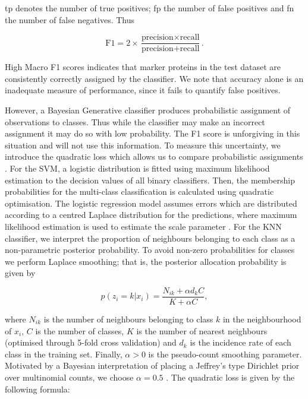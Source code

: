\documentclass[12pt,english]{article}\usepackage[]{graphicx}\usepackage[]{color}
\begin{document}
tp denotes the number of true positives; fp the number of
false positives and fn the number of false negatives. Thus

\[\text{F1}=2\times\frac{\text{precision}\times\text{recall}}{\text{precision}+\text{recall}}.\]

High Macro F1 scores indicates that marker proteins in the test
dataset are consistently correctly assigned by the classifier. We note
that accuracy alone is an inadequate measure of performance, since it
fails to quantify false positives.

However, a Bayesian Generative classifier produces probabilistic
assignment of observations to classes. Thus while the classifier may
make an incorrect assignment it may do so with low probability. The F1
score is unforgiving in this situation and will not use this
information.  To measure this uncertainty, we introduce the quadratic
loss which allows us to compare probabilistic assignments
\citep{Gneiting:2007}.  For the SVM, a logistic distribution is fitted
using maximum likelihood estimation to the decision values of all
binary classifiers. Then, the membership probabilities for the
multi-class classification is calculated using quadratic optimisation.
The logistic regression model assumes errors which are distributed
according to a centred Laplace distribution for the predictions, where
maximum likelihood estimation is used to estimate the scale parameter
\citep{Meyer:2017}.  For the KNN classifier, we interpret the
proportion of neighbours belonging to each class as a non-parametric
posterior probability. To avoid non-zero probabilities for classes we
perform Laplace smoothing; that is, the posterior allocation
probability is given by

\begin{equation}
p(z_i = k|x_i) = \frac{N_{ik} + \alpha d_k C}{K + \alpha C},
\end{equation}

where $N_{ik}$ is the number of neighbours belonging to class $k$ in
the neighbourhood of $x_i$, $C$ is the number of classes, $K$ is the
number of nearest neighbours (optimised through 5-fold cross
validation) and $d_k$ is the incidence rate of each class in the
training set. Finally, $\alpha >0$ is the pseudo-count smoothing
parameter. Motivated by a Bayesian interpretation of placing a
Jeffrey's type Dirichlet prior over multinomial counts, we choose
$\alpha = 0.5$ \citep{Hazimeh:2015, Valcarce:2016, Manning:2008}.  The
quadratic loss is given by the following formula:
\end{document}
